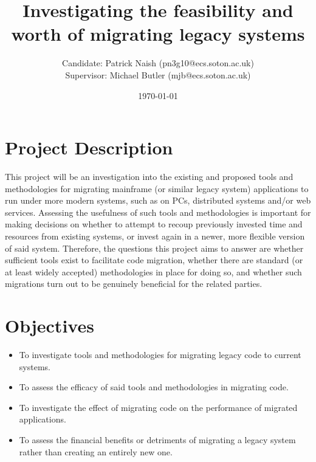 \documentclass[a4paper,10pt]{article}
\title{Investigating the feasibility and worth of migrating legacy systems}
\date{\today}
\author{Candidate: Patrick Naish (pn3g10@ecs.soton.ac.uk)\\Supervisor: Michael Butler (mjb@ecs.soton.ac.uk)}
\begin{document}
\maketitle

\section*{Project Description}
This project will be an investigation into the existing and proposed tools and methodologies for migrating mainframe (or similar legacy system) applications to run under more modern systems, such as on PCs, distributed systems and/or web services. Assessing the usefulness of such tools and methodologies is important for making decisions on whether to attempt to recoup previously invested time and resources from existing systems, or invest again in a newer, more flexible version of said system. Therefore, the questions this project aims to answer are whether sufficient tools exist to facilitate code migration, whether there are standard (or at least widely accepted) methodologies in place for doing so, and whether such migrations turn out to be genuinely beneficial for the related parties.

\section*{Objectives}
\begin{itemize}
	\item To investigate tools and methodologies for migrating legacy code to current systems.
	\item To assess the efficacy of said tools and methodologies in migrating code.
	\item To investigate the effect of migrating code on the performance of migrated applications.
	\item To assess the financial benefits or detriments of migrating a legacy system rather than creating an entirely new one.
\end{itemize}
\end{document}
